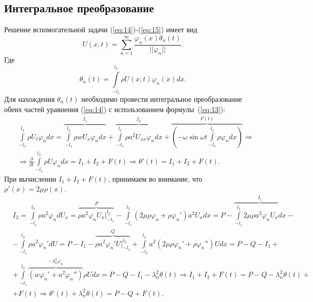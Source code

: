 \documentclass[12pt, a4paper, draft]{article}
\begin{document}
\subsection{Интегральное преобразование}
Решение вспомогательной задачи (\ref{eq:14})-(\ref{eq:15}) имеет вид 
\begin{equation}
  U(x,t)=\sum \limits_{n=1}^{\infty} \frac{\varphi_n(x) \theta_n(t)}{||\varphi_n||}.
\end{equation}
Где
\begin{equation}
  \theta_n(t) = \int \limits_{-l_1}^{l_2} \rho U(x,t) \varphi_n(x) dx.
  \label{eq:13}
\end{equation}
Для нахождения $\theta_n(t)$ необходимо провести интегральное преобразование обеих частей уравнения (\ref{eq:14}) с использованием формулы~(\ref{eq:13}):
\begin{equation}
  \begin{aligned}
    & \int \limits_{-l_1}^{l_2} \rho U_t \varphi_n dx = \overbrace{\int \limits_{-l_1}^{l_2} \rho w U_x \varphi_n dx}^{I_1} + \overbrace{\int \limits_{-l_1}^{l_2} \rho a^2 U_{xx} \varphi_n dx}^{I_2} +  \overbrace{\left( -\omega \sin \omega t \int \limits_{-l_1}^{l_2} \rho \varphi_n dx \right)}^{F(t)}  \Rightarrow \\
  & \Rightarrow \frac{\partial}{\partial t} \int \limits_{-l_1}^{l_2} \rho U \varphi_n dx = I_1 + I_2 + F(t) \Rightarrow \theta'(t) = I_1 + I_2 + F(t).
\end{aligned}
\end{equation}
При вычислении $I_1+I_2+F(t)$, принимаем во внимание, что $\rho'(x) = 2 \mu \rho(x)$.
\begin{equation}
  \begin{aligned}
    & I_2 = \int \limits_{-l_1}^{l_2} \rho a^2 \varphi_n d U_x = \overbrace{\rho a^2 \varphi_n U_x \Big|^{l_2}_{-l_1}}^P - 
    \int \limits_{-l_1}^{l_2} (2\mu\rho\varphi_n + \rho\varphi_n') a^2 U_x dx = P - \overbrace{\int \limits_{-l_1}^{l_2} 2 \mu \rho a^2 \varphi_n U_x dx}^{I_1} - \\
    & - \int \limits_{-l_1}^{l_2} \rho a^2\varphi_n'd U = P - I_1 - \overbrace{\rho a^2 \varphi_n' U \Big|^{l_2}_{-l_1}}^Q + 
    \int \limits_{-l_1}^{l_2} a^2 (2\mu\rho\varphi_n' + \rho\varphi_n'') U dx = P - Q - I_1 + \\
    & + \int \limits_{-l_1}^{l_2} \overbrace{(w\varphi_n' + a^2\varphi_n'')}^{-\lambda_n^2\varphi_n} \rho U dx = P - Q - I_1 - \lambda_n^2 \theta(t) \Rightarrow I_1 + I_2 + F(t) = P - Q - 
    \lambda_n^2 \theta(t) + \\
    & + F(t) \Rightarrow \theta'(t) + \lambda_n^2 \theta(t) = P - Q + F(t).
  \end{aligned}
  \label{eq:17}
\end{equation}
\end{document}
